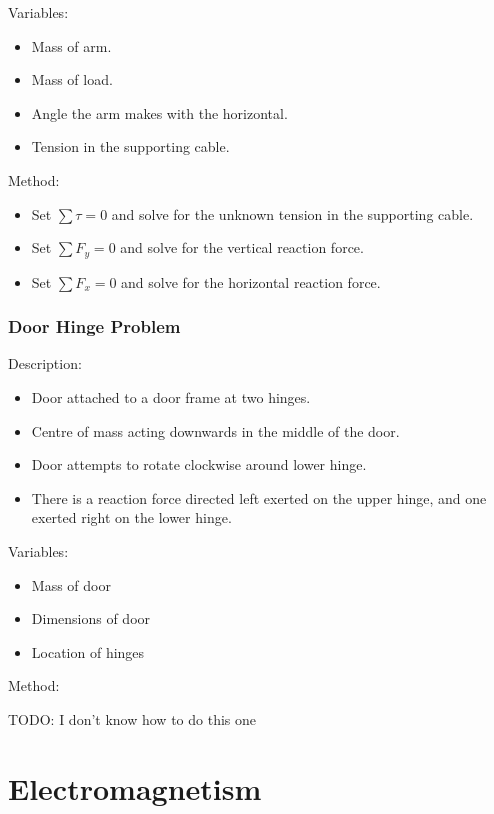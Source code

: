 \documentclass[a4paper,11pt]{report}
\begin{document}
Variables:

\begin{itemize}
\item Mass of arm.
\item Mass of load.
\item Angle the arm makes with the horizontal.
\item Tension in the supporting cable.
\end{itemize}

Method:

\begin{itemize}
\item Set $\sum \tau = 0$ and solve for the unknown tension in the supporting
	cable.
\item Set $\sum F_y = 0$ and solve for the vertical reaction force.
\item Set $\sum F_x = 0$ and solve for the horizontal reaction force.
\end{itemize}

\subsection{Door Hinge Problem}

Description:

\begin{itemize}
\item Door attached to a door frame at two hinges.
\item Centre of mass acting downwards in the middle of the door.
\item Door attempts to rotate clockwise around lower hinge.
\item There is a reaction force directed left exerted on the upper hinge, and
	one exerted right on the lower hinge.
\end{itemize}

Variables:

\begin{itemize}
\item Mass of door
\item Dimensions of door
\item Location of hinges
\end{itemize}

Method:

TODO: I don't know how to do this one




\chapter{Electromagnetism}
\end{document}

